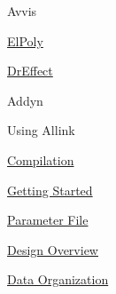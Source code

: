 \begin{DoxyItemize}
\item Avvis  
\item \hyperlink{ElPoly_page}{El\+Poly}  
\item \hyperlink{DrEffect_page}{Dr\+Effect}  
\item Addyn  
\end{DoxyItemize}Using Allink 
\begin{DoxyItemize}
\item \hyperlink{compile_page}{Compilation}  
\item \hyperlink{usage_page}{Getting Started}  
\item \hyperlink{param_page}{Parameter File} 
\item \hyperlink{design_page}{Design Overview}  
\end{DoxyItemize}\hyperlink{data_page}{Data Organization}   